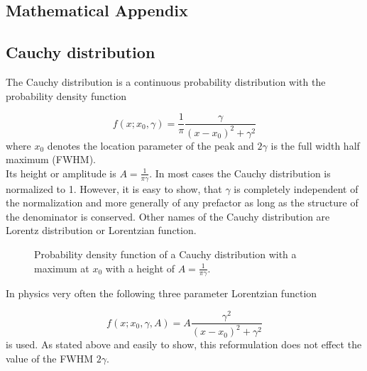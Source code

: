 \begin{appendix}

\chapter{Mathematical Appendix}
\section{Cauchy distribution} \label{section:app_cauchy}
The Cauchy distribution is a continuous probability distribution
with the probability density function

\begin{equation}
  f(x;x_0,\gamma) = \frac 1\pi \frac{\gamma}{(x-x_0)^2 + \gamma^2}
\end{equation}
where $x_0$ denotes the location parameter of the peak and
$2 \gamma$ is the full width half maximum (FWHM).\\
Its height or amplitude is $A = \frac{1}{\pi\gamma}$.
In most cases the
Cauchy distribution is normalized to 1. However, it is easy to show,
that $\gamma$ is completely
independent of the normalization and more generally of any prefactor
as long as the structure of the denominator is conserved.
Other names of the Cauchy distribution are Lorentz distribution or
Lorentzian function.


\begin{figure}[h]
  \centering
  
  \caption{Probability density function of a Cauchy distribution with a
           maximum at $x_0$ with a height of $A=\frac{1}{\pi\gamma}$.}
  \label{figure:cauchy_distribution}
\end{figure}


In physics very often the following three parameter Lorentzian function

\begin{equation}
  f(x;x_0,\gamma,A) = A \frac{\gamma^2}{(x-x_0)^2 + \gamma^2}
\end{equation}
is used. As stated above and easily to show, this reformulation does
not effect the value of the FWHM $2 \gamma$.



\end{appendix}
